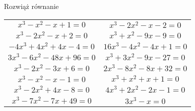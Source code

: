 \documentclass[a4paper,12pt,leqno,fleqn]{article}
\begin{document}
\newpage
Rozwiąż równanie

\begin{tabularx}{\linewidth}{@{}XX@{}}

  \begin{equation}
    x^3-x^2-x+1=0
  \end{equation}
&
  \begin{equation}
    x^3-2x^2-x-2=0
  \end{equation}
\\
  \begin{equation}
    x^3-2x^2-x+2=0
  \end{equation}
&
  \begin{equation}
    x^3+x^2-9x-9=0
  \end{equation}
\\
  \begin{equation}
    -4x^3+4x^2+4x-4=0
  \end{equation}
&
  \begin{equation}
    16x^3-4x^2-4x+1=0
  \end{equation}
\\
  \begin{equation}
    3x^3-6x^2-48x+96=0
  \end{equation}
&
  \begin{equation}
    x^3+3x^2-9x-27=0
  \end{equation}
\\
  \begin{equation}
    x^3-2x^2-3x+6=0
  \end{equation}
&
  \begin{equation}
    2x^3-8x^2-8x+32=0
  \end{equation}
\\
  \begin{equation}
    x^3-x^2-x-1=0
  \end{equation}
&
  \begin{equation}
    x^3+x^2+x+1=0
  \end{equation}
\\
  \begin{equation}
    x^3-2x^2+4x-8=0
  \end{equation}
&
  \begin{equation}
    4x^3+2x^2-2x-1=0
  \end{equation}
\\
  \begin{equation}
    x^3-7x^2-7x+49=0
  \end{equation}
&
  \begin{equation}
    3x^3-x=0
  \end{equation}

\end{tabularx}
\end{document}
